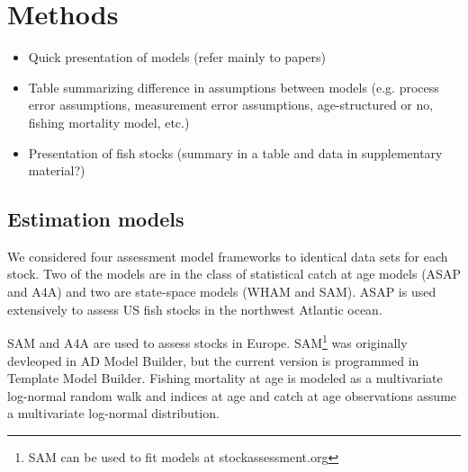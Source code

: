 \documentclass[12pt,letterpaper, leqno]{article}
\begin{document}

\section*{Methods}

\begin{itemize}
\item Quick presentation of models (refer mainly to papers)
\item Table summarizing difference in assumptions between models (e.g. process error assumptions, measurement error assumptions, age-structured or no, fishing mortality model, etc.)
\item Presentation of fish stocks (summary in a table and data in supplementary material?)
\end{itemize}

\subsection*{Estimation models}

We considered four assessment model frameworks to identical data sets for each stock. Two of the models are in the class of statistical catch at age models (ASAP and A4A) and two are state-space models (WHAM and SAM). ASAP is used extensively to assess US fish stocks in the northwest Atlantic ocean. 

SAM and A4A are used to assess stocks in Europe. SAM\footnote{SAM can be used to fit models at stockassessment.org} was originally devleoped in AD Model Builder, but the current version is programmed in Template Model Builder. Fishing mortality at age is modeled as a multivariate log-normal random walk and indices at age and catch at age observations assume a multivariate log-normal distribution.
\end{document}
